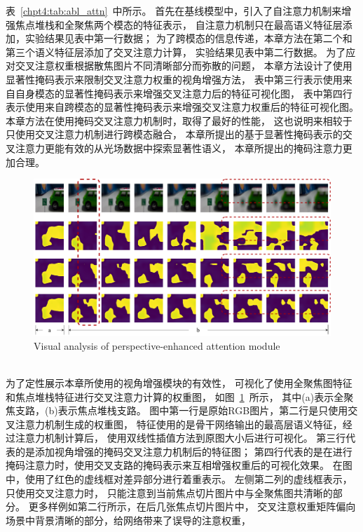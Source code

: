 表~\ref{chpt4:tab:abl_attn}~中所示。
首先在基线模型中，引入了自注意力机制来增强焦点堆栈和全聚焦两个模态的特征表示，
自注意力机制只在最高语义特征层添加，实验结果见表中第一行数据；
为了跨模态的信息传递，本章方法在第二个和第三个语义特征层添加了交叉注意力计算，
实验结果见表中第二行数据。
为了应对交叉注意权重根据散焦图片不同清晰部分而弥散的问题，
本章方法设计了使用显著性掩码表示来限制交叉注意力权重的视角增强方法，
表中第三行表示使用来自自身模态的显著性掩码表示来增强交叉注意力后的特征可视化图，
表中第四行表示使用来自跨模态的显著性掩码表示来增强交叉注意力权重后的特征可视化图。
本章方法在使用掩码交叉注意力机制时，取得了最好的性能，
这也说明来相较于只使用交叉注意力机制进行跨模态融合，
本章所提出的基于显著性掩码表示的交叉注意力更能有效的从光场数据中探索显著性语义，
本章所提出的掩码注意力更加合理。
\begin{figure}[!ht]
	\centering
	\includegraphics[width=\linewidth]{figures/chapter4/attn_show}
	{Visual analysis of perspective-enhanced attention module}
	\label{chpt4:figure:attn_show}
\end{figure}
\\
%
%
%
%
\indent
为了定性展示本章所使用的视角增强模块的有效性，
可视化了使用全聚焦图特征和焦点堆栈特征进行交叉注意力计算的权重图，
如图~\ref{chpt4:figure:attn_show}~所示，
其中(a)表示全聚焦支路，(b)表示焦点堆栈支路。
图中第一行是原始RGB图片，第二行是只使用交叉注意力机制生成的权重图，
特征使用的是骨干网络输出的最高层语义特征，经过注意力机制计算后，
使用双线性插值方法到原图大小后进行可视化。
第三行代表的是添加视角增强的掩码交叉注意力机制后的特征图；
第四行代表的是在进行掩码注意力时，使用交叉支路的掩码表示来互相增强权重后的可视化效果。
在图中，使用了红色的虚线框对差异部分进行着重表示。
左侧第二列的虚线框表示，只使用交叉注意力时，
只能注意到当前焦点切片图片中与全聚焦图共清晰的部分。
更多样例如第二行所示，在后几张焦点切片图片中，
交叉注意权重矩阵偏向场景中背景清晰的部分，给网络带来了误导的注意权重，
